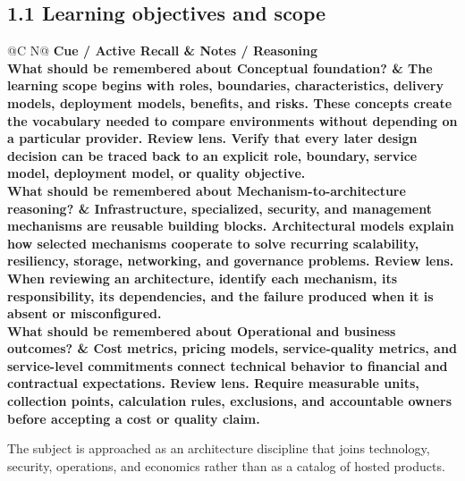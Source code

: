 \documentclass[11pt]{article}
\newcommand{\CornellHeader}{\rowcolor{Navy}\color{white}\bfseries Cue / Active Recall & \color{white}\bfseries Notes / Reasoning \\\endhead}
\newcommand{\CornellRow}[2]{\cellcolor{CueGray}\textbf{#1} & #2 \\\addlinespace[3pt]}
\begin{document}
\subsection{1.1 Learning objectives and scope}
\begin{longtable}{@{}C N@{}}
\CornellHeader
\CornellRow{What should be remembered about Conceptual foundation?}{The learning scope begins with roles, boundaries, characteristics, delivery models, deployment models, benefits, and risks. These concepts create the vocabulary needed to compare environments without depending on a particular provider. \textbf{Review lens.} Verify that every later design decision can be traced back to an explicit role, boundary, service model, deployment model, or quality objective.}
\CornellRow{What should be remembered about Mechanism-to-architecture reasoning?}{Infrastructure, specialized, security, and management mechanisms are reusable building blocks. Architectural models explain how selected mechanisms cooperate to solve recurring scalability, resiliency, storage, networking, and governance problems. \textbf{Review lens.} When reviewing an architecture, identify each mechanism, its responsibility, its dependencies, and the failure produced when it is absent or misconfigured.}
\CornellRow{What should be remembered about Operational and business outcomes?}{Cost metrics, pricing models, service-quality metrics, and service-level commitments connect technical behavior to financial and contractual expectations. \textbf{Review lens.} Require measurable units, collection points, calculation rules, exclusions, and accountable owners before accepting a cost or quality claim.}
\end{longtable}
\begin{sectionsummarybox}
The subject is approached as an architecture discipline that joins technology, security, operations, and economics rather than as a catalog of hosted products.
\end{sectionsummarybox}
\end{document}
